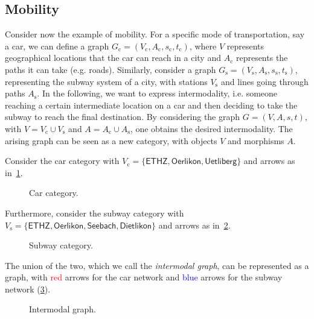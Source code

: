\subsection{Mobility}
Consider now the example of mobility. For a specific mode of transportation, say a car, we can define a graph $G_\mathrm{c}=(V_\mathrm{c},A_\mathrm{c},s_\mathrm{c},t_\mathrm{c})$, where $V$ represents geographical locations that the car can reach in a city and $A_\mathrm{c}$ represents the paths it can take (e.g. roads). Similarly, consider a graph $G_\mathrm{s}=(V_\mathrm{s},A_\mathrm{s},s_\mathrm{s},t_\mathrm{s})$, representing the subway system of a city, with stations $V_\mathrm{s}$ and lines going through paths $A_\mathrm{s}$. In the following, we want to express intermodality, i.e. someone reaching a certain intermediate location on a car and then deciding to take the subway to reach the final destination. By considering the graph $G=(V,A,s,t)$, with $V=V_\mathrm{c}\cup V_\mathrm{s}$ and $A=A_\mathrm{c}\cup A_\mathrm{s}$, one obtains the desired intermodality. The arising graph can be seen as a new category, with objects $V$ and morphisms $A$.
\begin{example}
Consider the car category with $V_\mathrm{c}=\{\mathsf{ETHZ},\mathsf{Oerlikon},\mathsf{Uetliberg}\}$ and arrows as in~\cref{fig:carcat}.

\begin{figure}[h!]
\begin{center}
\end{center}
\caption{Car category. \label{fig:carcat}}
\end{figure}

Furthermore, consider the subway category with $V_\mathrm{s}=\{\mathsf{ETHZ},\mathsf{Oerlikon},\mathsf{Seebach},\mathsf{Dietlikon}\}$ and arrows as in~\cref{fig:subcat}.


\begin{figure}[h!]
\begin{center}
\end{center}
\caption{Subway category. \label{fig:subcat}}
\end{figure}
The union of the two, which we call the \emph{intermodal graph}, can be represented as a graph, with \textcolor{red}{red} arrows for the car network and \textcolor{blue}{blue} arrows for the subway network (\cref{fig:intermodal}).

\begin{figure}[h!]
\begin{center}
\end{center}
\caption{Intermodal graph. \label{fig:intermodal}}
\end{figure}
\end{example}

